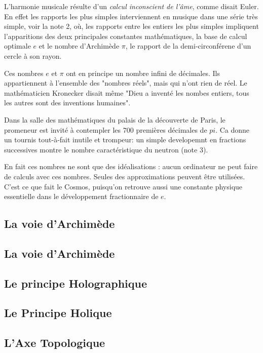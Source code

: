 \documentclass[a4paper,12pt]{article}
\begin{document}
L'harmonie musicale résulte d'un \textit{calcul inconscient de l'âme}, comme disait Euler. En effet les rapports les plus simples interviennent en musique dans une série très simple, voir la note 2, où, les rapports entre les entiers les plus simples impliquent l'apparitions des deux principales constantes mathématiques, la base de calcul optimale $e$ et le nombre d'Archimède $\pi$, le rapport de la demi-circonférene d'un cercle à son rayon.

Ces nombres $e$ et $\pi$ ont en principe un nombre infini de décimales. Ils appartiennent à l'ensemble des "nombres réels", mais qui n'ont rien de réel. Le mathématicien Kronecker disait même "Dieu a inventé les nombes entiers, tous les autres sont des inventions humaines".

Dans la salle des mathématiques du palais de la découverte de Paris, le promeneur est invité à contempler les 700 premières décimales de $pi$. Ca donne un tournis tout-à-fait inutile et trompeur: un simple developemnt en fractions successives montre le nombre caractéristique du neutron (note 3).

En fait ces nombres ne sont que des idéalisations : aucun ordinateur ne peut faire de calculs avec ces nombres. Seules des approximations peuvent être utilisées. C'est ce que fait le Cosmos, puisqu'on retrouve aussi une constante physique essentielle dans le développement fractionnaire de $e$. 



\subsection{La voie d'Archimède}









\subsection{La voie d'Archimède}
\subsection{Le principe Holographique}
\subsection{Le Principe Holique}
\subsection{L'Axe Topologique}
\end{document}
